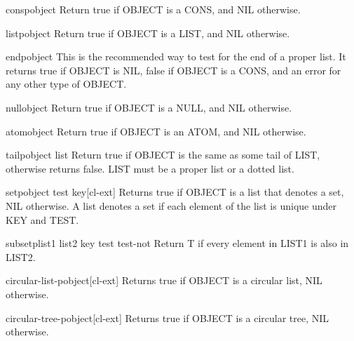 \documentclass[10pt,english]{book}
\begin{document}
\begin{function}{consp}{object}
  Return true if OBJECT is a CONS, and NIL otherwise.
\end{function}

\begin{function}{listp}{object}
  Return true if OBJECT is a LIST, and NIL otherwise.
\end{function}

\begin{function}{endp}{object}
  This is the recommended way to test for the end of a proper list. It
  returns true if OBJECT is NIL, false if OBJECT is a CONS, and an error
  for any other type of OBJECT.
\end{function}

\begin{function}{null}{object}
  Return true if OBJECT is a NULL, and NIL otherwise.
\end{function}

\begin{function}{atom}{object}
  Return true if OBJECT is an ATOM, and NIL otherwise.
\end{function}

\begin{function}{tailp}{object list}
  Return true if OBJECT is the same as some tail of LIST, otherwise
   returns false. LIST must be a proper list or a dotted list.
\end{function}

\begin{function}{setp}{object \key test key}[cl-ext]
  Returns true if OBJECT is a list that denotes a set, NIL otherwise. A list
denotes a set if each element of the list is unique under KEY and TEST.
\end{function}

\begin{function}{subsetp}{list1 list2 \key key test test-not}
  Return T if every element in LIST1 is also in LIST2.
\end{function}

\begin{function}{circular-list-p}{object}[cl-ext]
  Returns true if OBJECT is a circular list, NIL otherwise.
\end{function}

\begin{function}{circular-tree-p}{object}[cl-ext]
  Returns true if OBJECT is a circular tree, NIL otherwise.
\end{function}
\end{document}
